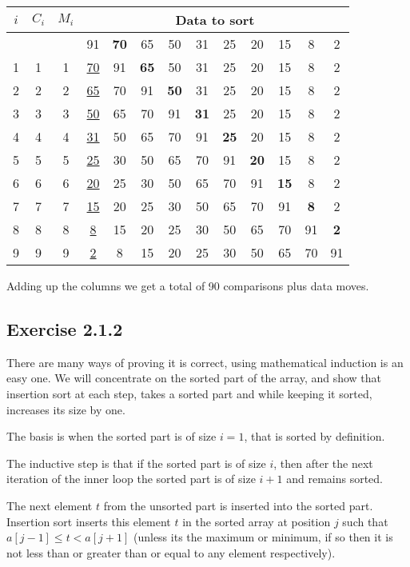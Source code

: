\documentclass{article}
\begin{document}
\begin{tabular}{|c|c|c|c|c|c|c|c|c|c|c|c|c|}
\hline
\(i\)& \(C_i\)& \(M_i\) &\multicolumn{10}{|c|}{\textbf{Data to sort}} \\
\hline
\multicolumn{3}{|c|}{}& 91& \textbf{70}& 65& 50& 31& 25& 20& 15& 8& 2 \\
\hline
1& 1& 1& \underline{70} & 91& \textbf{65}& 50& 31& 25& 20& 15& 8& 2 \\
\hline
2& 2& 2& \underline{65} & 70& 91& \textbf{50}& 31& 25& 20& 15& 8& 2 \\
\hline
3& 3& 3& \underline{50} & 65& 70& 91& \textbf{31}& 25& 20& 15& 8& 2 \\
\hline
4& 4& 4& \underline{31} & 50& 65& 70& 91& \textbf{25}& 20& 15& 8& 2 \\
\hline
5& 5& 5& \underline{25} & 30& 50& 65& 70& 91& \textbf{20}& 15& 8& 2 \\
\hline
6& 6& 6& \underline{20} & 25& 30& 50& 65& 70& 91& \textbf{15}& 8& 2 \\
\hline
7& 7& 7& \underline{15} & 20& 25& 30& 50& 65& 70& 91& \textbf{8}& 2 \\
\hline
8& 8& 8& \underline{8} & 15& 20& 25& 30& 50& 65& 70& 91& \textbf{2} \\
\hline
9& 9& 9& \underline{2} & 8& 15& 20& 25& 30& 50& 65& 70& 91 \\
\hline
\end{tabular}

Adding up the columns we get a total of 90 comparisons plus data moves. 


\subsection*{Exercise 2.1.2}

There are many ways of proving it is correct, using mathematical induction is an easy one. We will concentrate on the sorted part of the array, and show that insertion sort at each step, takes a sorted part and while keeping it sorted, increases its size by one.

The basis is when the sorted part is of size \(i=1\), that is sorted by definition.

The inductive step is that if the sorted part is of size \(i\), then after the next iteration of the inner loop the sorted part is of size \(i+1\) and remains sorted. 

The next element \(t\) from the unsorted part is inserted into the sorted part. Insertion sort inserts this element \(t\) in the sorted array at position \(j\) such that \(a[j-1] \leq t < a[j+1]\) (unless its the maximum or minimum, if so then it is not less than or greater than or equal to any element respectively). 
\end{document}
